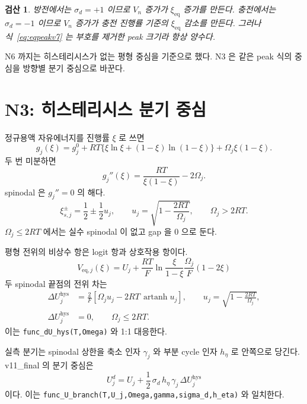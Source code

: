 \documentclass[11pt,a4paper]{article}
\newtheorem*{verifybox}{검산}
\newcommand{\eq}{\mathrm{eq}}
\newcommand{\hys}{\mathrm{hys}}
\begin{document}
\begin{verifybox}
방전에서는 $\sigma_d=+1$ 이므로 $V_n$ 증가가 $\xi_{\eq}$ 증가를 만든다. 충전에서는 $\sigma_d=-1$ 이므로 $V_n$ 증가가 충전 진행률 기준의 $\xi_{\eq}$ 감소를 만든다. 그러나 식~\eqref{eq:eqpeakv7} 는 부호를 제거한 peak 크기라 항상 양수다.
\end{verifybox}

N6 까지는 히스테리시스가 없는 평형 중심을 기준으로 했다. N3 은 같은 peak 식의 중심을 방향별 분기 중심으로 바꾼다.

\section{N3: 히스테리시스 분기 중심}\label{sec:n3}
정규용액 자유에너지를 진행률 $\xi$ 로 쓰면
\begin{equation}
g_j(\xi)=g_j^0+RT\{\xi\ln\xi+(1-\xi)\ln(1-\xi)\}+\Omega_j\xi(1-\xi).
\label{eq:gxi_v7}
\end{equation}
두 번 미분하면
\begin{equation}
g_j''(\xi)=\frac{RT}{\xi(1-\xi)}-2\Omega_j.
\label{eq:gpp_v7}
\end{equation}
spinodal 은 $g_j''=0$ 의 해다.
\begin{equation}
\xi_{s,j}^{\pm}=\frac12\pm\frac12u_j,\qquad
u_j=\sqrt{1-\frac{2RT}{\Omega_j}},\qquad \Omega_j>2RT.
\label{eq:spinodal_v7}
\end{equation}
$\Omega_j\le2RT$ 에서는 실수 spinodal 이 없고 gap 을 0 으로 둔다.

평형 전위의 비상수 항은 logit 항과 상호작용 항이다.
\begin{equation}
V_{\eq,j}(\xi)=U_j+\frac{RT}{F}\ln\frac{\xi}{1-\xi}
\frac{\Omega_j}{F}(1-2\xi)
\label{eq:Veq_v7}
\end{equation}
두 spinodal 끝점의 전위 차는
\begin{align}
\Delta U_j^\hys
&=\frac{2}{F}\left[\Omega_j u_j-2RT\,\operatorname{artanh}u_j\right],
\qquad u_j=\sqrt{1-\frac{2RT}{\Omega_j}},\label{eq:dUhysraw}\\
\Delta U_j^\hys&=0,\qquad \Omega_j\le2RT.
\label{eq:dUhyszero}
\end{align}
이는 \texttt{func\_dU\_hys(T,Omega)} 와 1:1 대응한다.

실측 분기는 spinodal 상한을 축소 인자 $\gamma_j$ 와 부분 cycle 인자 $h_\eta$ 로 안쪽으로 당긴다. v11\_final 의 분기 중심은
\begin{equation}
\boxed{\;U_j^d=U_j+\frac12\,\sigma_d\,h_\eta\,\gamma_j\,\Delta U_j^\hys\;}
\label{eq:Ubranch}
\end{equation}
이다. 이는 \texttt{func\_U\_branch(T,U\_j,Omega,gamma,sigma\_d,h\_eta)} 와 일치한다.
\end{document}
